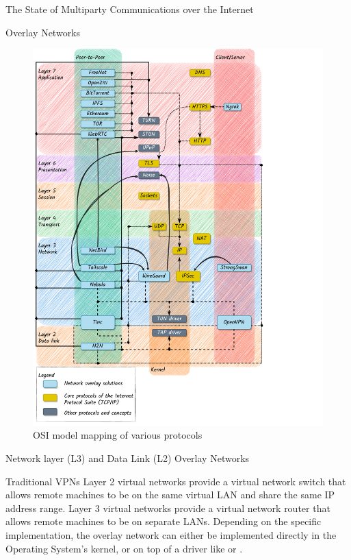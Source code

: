 \begin{frame}[fragile]{The State of Multiparty Communications over the
Internet}
\begin{block}{Overlay Networks}
\begin{figure}
\centering
\includegraphics[width=\textwidth,height=0.9\textheight]{thesis/../figures/osi-map-overlays.drawio.pdf}
\caption{OSI model mapping of various protocols
\label{osi-map-overlays}}
\end{figure}

\begin{block}{Network layer (L3) and Data Link (L2) Overlay Networks}
\protect\hypertarget{network-layer-l3-and-data-link-l2-overlay-networks}{}
\begin{block}{Traditional VPNs}
\protect\hypertarget{traditional-vpns}{}
Layer 2 virtual networks provide a virtual network switch that allows
remote machines to be on the same virtual LAN and share the same IP
address range. Layer 3 virtual networks provide a virtual network router
that allows remote machines to be on separate LANs. Depending on the
specific implementation, the overlay network can either be implemented
directly in the Operating System's kernel, or on top of a driver like
 or .


\end{block}
\end{block}
\end{block}
\end{frame}
